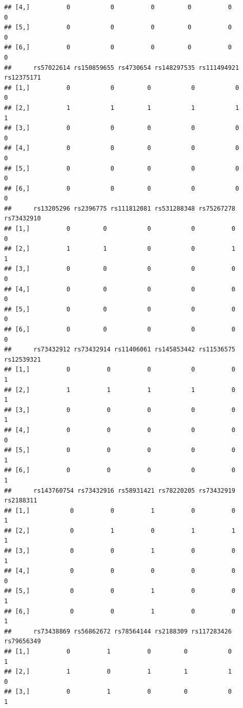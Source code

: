 \documentclass[
]{article}
\begin{document}
\begin{verbatim}
## [4,]          0           0          0         0          0           0
## [5,]          0           0          0         0          0           0
## [6,]          0           0          0         0          0           0
##      rs57022614 rs150859655 rs4730654 rs148297535 rs111494921 rs12375171
## [1,]          0           0         0           0           0          0
## [2,]          1           1         1           1           1          1
## [3,]          0           0         0           0           0          0
## [4,]          0           0         0           0           0          0
## [5,]          0           0         0           0           0          0
## [6,]          0           0         0           0           0          0
##      rs13205296 rs2396775 rs111812081 rs531288348 rs75267278 rs73432910
## [1,]          0         0           0           0          0          0
## [2,]          1         1           0           0          1          1
## [3,]          0         0           0           0          0          0
## [4,]          0         0           0           0          0          0
## [5,]          0         0           0           0          0          0
## [6,]          0         0           0           0          0          0
##      rs73432912 rs73432914 rs11406061 rs145853442 rs11536575 rs12539321
## [1,]          0          0          0           0          0          1
## [2,]          1          1          1           1          0          1
## [3,]          0          0          0           0          0          1
## [4,]          0          0          0           0          0          0
## [5,]          0          0          0           0          0          1
## [6,]          0          0          0           0          0          1
##      rs143760754 rs73432916 rs58931421 rs78220205 rs73432919 rs2188311
## [1,]           0          0          1          0          0         1
## [2,]           0          1          0          1          1         1
## [3,]           0          0          1          0          0         1
## [4,]           0          0          0          0          0         0
## [5,]           0          0          1          0          0         1
## [6,]           0          0          1          0          0         1
##      rs73438869 rs56862672 rs78564144 rs2188309 rs117283426 rs79656349
## [1,]          0          1          0         0           0          1
## [2,]          1          0          1         1           1          0
## [3,]          0          1          0         0           0          1

\end{verbatim}
\end{document}
